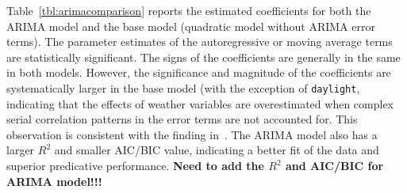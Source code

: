 \documentclass [11pt, proquest] {uwthesis}[2015/03/03]
\begin{document}
Table~\ref{tbl:arimacomparison} reports the estimated coefficients for both the ARIMA model and the base model (quadratic model without ARIMA error terms). The parameter estimates of the autoregressive or moving average terms are statistically significant. The signs of the coefficients are generally in the same in both models. However, the significance and magnitude of the coefficients are systematically larger in the base model (with the exception of \texttt{daylight}, indicating that the effects of weather variables are overestimated when complex serial correlation patterns in the error terms are not accounted for. This observation is consistent with the finding in~\cite{Gallop:2012aa}. The ARIMA model also has a larger $R^2$ and smaller AIC/BIC value, indicating a better fit of the data and superior predicative performance. \textbf{Need to add the $R^2$ and AIC/BIC for ARIMA model!!!}
\end{document}
